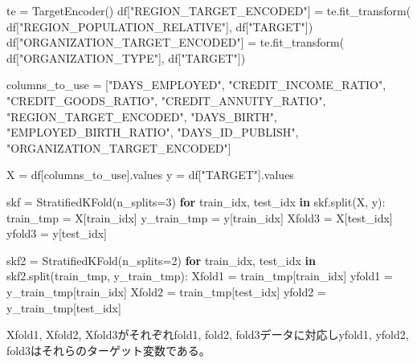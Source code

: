 \documentclass[11pt]{jsarticle}
\newenvironment{Shaded}{}{}
\newcommand{\KeywordTok}[1]{\textcolor[rgb]{0.00,0.44,0.13}{\textbf{{#1}}}}
\newcommand{\DecValTok}[1]{\textcolor[rgb]{0.25,0.63,0.44}{{#1}}}
\newcommand{\StringTok}[1]{\textcolor[rgb]{0.25,0.44,0.63}{{#1}}}
\newcommand{\NormalTok}[1]{{#1}}
\newcommand{\ControlFlowTok}[1]{\textcolor[rgb]{0.00,0.44,0.13}{\textbf{{#1}}}}
\newcommand{\OperatorTok}[1]{\textcolor[rgb]{0.40,0.40,0.40}{{#1}}}
\begin{document}
\begin{Shaded}
\begin{Highlighting}[]
\NormalTok{te }\OperatorTok{=}\NormalTok{ TargetEncoder()}
\NormalTok{df[}\StringTok{"REGION_TARGET_ENCODED"}\NormalTok{] }\OperatorTok{=}\NormalTok{ te.fit_transform(}
\NormalTok{    df[}\StringTok{"REGION_POPULATION_RELATIVE"}\NormalTok{], df[}\StringTok{"TARGET"}\NormalTok{])}
\NormalTok{df[}\StringTok{"ORGANIZATION_TARGET_ENCODED"}\NormalTok{] }\OperatorTok{=}\NormalTok{ te.fit_transform(}
\NormalTok{    df[}\StringTok{"ORGANIZATION_TYPE"}\NormalTok{], df[}\StringTok{"TARGET"}\NormalTok{])}

\NormalTok{columns_to_use }\OperatorTok{=}\NormalTok{ [}\StringTok{"DAYS_EMPLOYED"}\NormalTok{, }\StringTok{"CREDIT_INCOME_RATIO"}\NormalTok{, }\StringTok{"CREDIT_GOODS_RATIO"}\NormalTok{,}
                  \StringTok{"CREDIT_ANNUITY_RATIO"}\NormalTok{, }\StringTok{"REGION_TARGET_ENCODED"}\NormalTok{,}
                  \StringTok{"DAYS_BIRTH"}\NormalTok{, }\StringTok{"EMPLOYED_BIRTH_RATIO"}\NormalTok{,}
                  \StringTok{"DAYS_ID_PUBLISH"}\NormalTok{, }\StringTok{"ORGANIZATION_TARGET_ENCODED"}\NormalTok{]}

\NormalTok{X }\OperatorTok{=}\NormalTok{ df[columns_to_use].values}
\NormalTok{y }\OperatorTok{=}\NormalTok{ df[}\StringTok{"TARGET"}\NormalTok{].values}

\NormalTok{skf }\OperatorTok{=}\NormalTok{ StratifiedKFold(n_splits}\OperatorTok{=}\DecValTok{3}\NormalTok{)}
\ControlFlowTok{for}\NormalTok{ train_idx, test_idx }\KeywordTok{in}\NormalTok{ skf.split(X, y):}
\NormalTok{    train_tmp }\OperatorTok{=}\NormalTok{ X[train_idx]}
\NormalTok{    y_train_tmp }\OperatorTok{=}\NormalTok{ y[train_idx]}
\NormalTok{    Xfold3 }\OperatorTok{=}\NormalTok{ X[test_idx]}
\NormalTok{    yfold3 }\OperatorTok{=}\NormalTok{ y[test_idx]}
    
\NormalTok{skf2 }\OperatorTok{=}\NormalTok{ StratifiedKFold(n_splits}\OperatorTok{=}\DecValTok{2}\NormalTok{)}
\ControlFlowTok{for}\NormalTok{ train_idx, test_idx }\KeywordTok{in}\NormalTok{ skf2.split(train_tmp, y_train_tmp):}
\NormalTok{    Xfold1 }\OperatorTok{=}\NormalTok{ train_tmp[train_idx]}
\NormalTok{    yfold1 }\OperatorTok{=}\NormalTok{ y_train_tmp[train_idx]}
\NormalTok{    Xfold2 }\OperatorTok{=}\NormalTok{ train_tmp[test_idx]}
\NormalTok{    yfold2 }\OperatorTok{=}\NormalTok{ y_train_tmp[test_idx]}
\end{Highlighting}
\end{Shaded}

    Xfold1, Xfold2, Xfold3がそれぞれfold1, fold2, fold3データに対応しyfold1,
yfold2, fold3はそれらのターゲット変数である。
\end{document}
